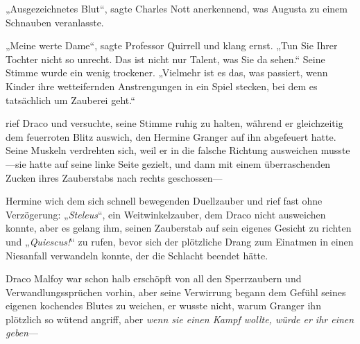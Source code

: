 „Ausgezeichnetes Blut“, sagte Charles Nott anerkennend, was Augusta zu einem Schnauben veranlasste.

„Meine werte Dame“, sagte Professor Quirrell und klang ernst. „Tun Sie Ihrer Tochter nicht so unrecht. Das ist nicht nur Talent, was Sie da sehen.“ Seine Stimme wurde ein wenig trockener. „Vielmehr ist es das, was passiert, wenn Kinder ihre wetteifernden Anstrengungen in ein Spiel stecken, bei dem es tatsächlich um Zauberei geht.“

\later

 rief Draco und versuchte, seine Stimme ruhig zu halten, während er gleichzeitig dem feuerroten Blitz auswich, den Hermine Granger auf ihn abgefeuert hatte. Seine Muskeln verdrehten sich, weil er in die falsche Richtung ausweichen musste—sie hatte auf seine linke Seite gezielt, und dann mit einem überraschenden Zucken ihres Zauberstabs nach rechts geschossen—

Hermine wich dem sich schnell bewegenden Duellzauber und rief fast ohne Verzögerung: „\emph{Steleus}“, ein Weitwinkelzauber, dem Draco nicht ausweichen konnte, aber es gelang ihm, seinen Zauberstab auf sein eigenes Gesicht zu richten und „\emph{Quiescus!}“ zu rufen, bevor sich der plötzliche Drang zum Einatmen in einen Niesanfall verwandeln konnte, der die Schlacht beendet hätte.

Draco Malfoy war schon halb erschöpft von all den Sperrzaubern und Verwandlungssprüchen vorhin, aber seine Verwirrung begann dem Gefühl seines eigenen kochendes Blutes zu weichen, er wusste nicht, warum Granger ihn plötzlich so wütend angriff, aber \emph{wenn sie einen Kampf wollte, würde er ihr einen geben}—

